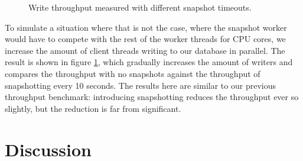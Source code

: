 \documentclass[b5paper]{report}
\begin{document}
\begin{figure}[H]
  \centering

  \caption{
    Write throughput measured with different snapshot timeouts.
    \label{fig:writer-throughput}
  }
\end{figure}

To simulate a situation where that is not the case, where the snapshot worker
would have to compete with the rest of the worker threads for CPU cores, we
increase the amount of client threads writing to our database in parallel. The
result is shown in figure \ref{fig:writer-throughput}, which gradually increases the
amount of writers and compares the throughput with no snapshots against the
throughput of snapshotting every 10 seconds. The results here are similar to
our previous throughput benchmark: introducing snapshotting reduces the
throughput ever so slightly, but the reduction is far from significant.

\chapter{Discussion} \label{chap:discussion}
\end{document}
